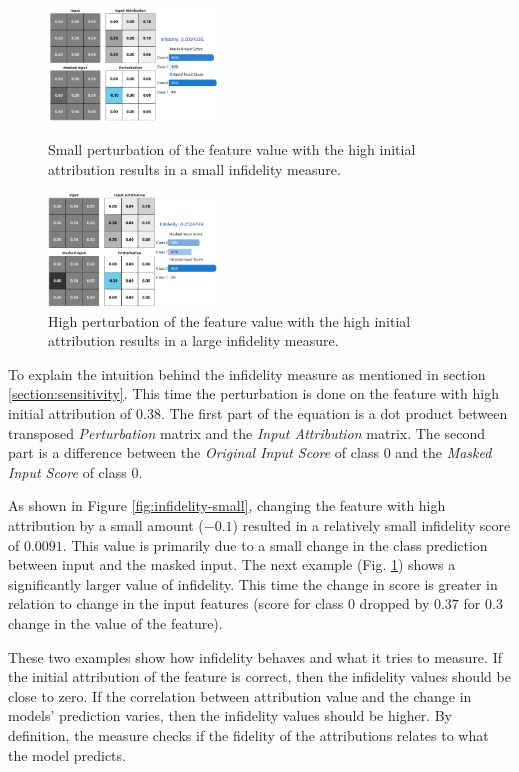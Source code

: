 \begin{figure}
  \includegraphics[width=0.40\textwidth]{methods/images/infidelity-small.png}
  \caption{Small perturbation of the feature value with the high initial attribution results in a small infidelity measure.}\label{fig:infidelity-small}
  \smallskip\par
  \includegraphics[width=0.40\textwidth]{methods/images/infidelity-large.png}
  \caption{High perturbation of the feature value with the high initial attribution results in a large infidelity measure.}\label{fig:infidelity-large}
\end{figure}

\vspace{\baselineskip}

To explain the intuition behind the infidelity measure as mentioned in section \ref{section:sensitivity}. This time the perturbation is done on the feature with high initial attribution of $0.38$. The first part of the equation is a dot product between transposed \textit{Perturbation} matrix and the \textit{Input Attribution} matrix. The second part is a difference between the \textit{Original Input Score} of class $0$ and the \textit{Masked Input Score} of class $0$.

\vspace{\baselineskip}

As shown in Figure \ref{fig:infidelity-small}, changing the feature with high attribution by a small amount ($-0.1$) resulted in a relatively small infidelity score of $0.0091$. This value is primarily due to a small change in the class prediction between input and the masked input. The next example (Fig. \ref{fig:infidelity-large}) shows a significantly larger value of infidelity. This time the change in score is greater in relation to change in the input features (score for class $0$ dropped by $0.37$ for $0.3$ change in the value of the feature). 

\vspace{\baselineskip}

These two examples show how infidelity behaves and what it tries to measure. If the initial attribution of the feature is correct, then the infidelity values should be close to zero. If the correlation between attribution value and the change in models' prediction varies, then the infidelity values should be higher. By definition, the measure checks if the fidelity of the attributions relates to what the model predicts.